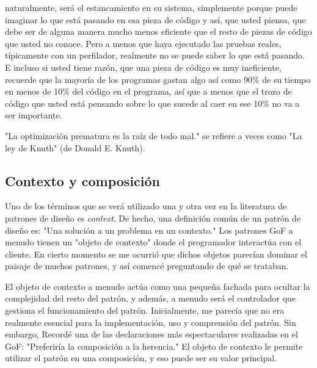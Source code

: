 

naturalmente, será el estancamiento en su sistema, simplemente porque puede imaginar lo que está pasando en esa pieza de código y así, que usted piensa, que debe ser de alguna manera mucho menos eficiente que el resto de piezas de código que usted no conoce. Pero a menos que haya ejecutado las pruebas reales, típicamente con un perfilador, realmente no se puede saber lo que está pasando. E incluso si usted tiene razón, que una pieza de código es muy ineficiente, recuerde que la mayoría de los programas gastan algo así como 90\% de su tiempo en menos de 10\% del código en el programa, así que a menos que el trozo de código que usted está pensando sobre lo que sucede al caer en ese 10\% no va a ser importante. \newline

"La optimización prematura es la raíz de todo mal." se refiere a veces como "La ley de Knuth" (de Donald E. Knuth).
 
 
\subsection*{Contexto y composición}
\label{sec:concom}

Uno de los términos que se verá utilizado una y otra vez en la literatura de patrones de diseño es \textit{context}. De hecho, una definición común de un patrón de diseño es: "Una solución a un problema en un contexto." Los patrones GoF a menudo tienen un "objeto de contexto" donde el programador interactúa con el cliente. En cierto momento se me ocurrió que dichos objetos parecían dominar el paisaje de muchos patrones, y así comencé preguntando de qué se trataban. \newline

El objeto de contexto a menudo actúa como una pequeña fachada para ocultar la complejidad del resto del patrón, y además, a menudo será el controlador que gestiona el funcionamiento del patrón. Inicialmente, me parecía que no era realmente esencial para la implementación, uso y comprensión del patrón. Sin embargo, Recordé una de las declaraciones más espectaculares realizadas en el GoF: 
 "Preferiría la composición a la herencia." El objeto de contexto le permite utilizar el patrón en una composición, y eso puede ser su valor principal.

\newpage
